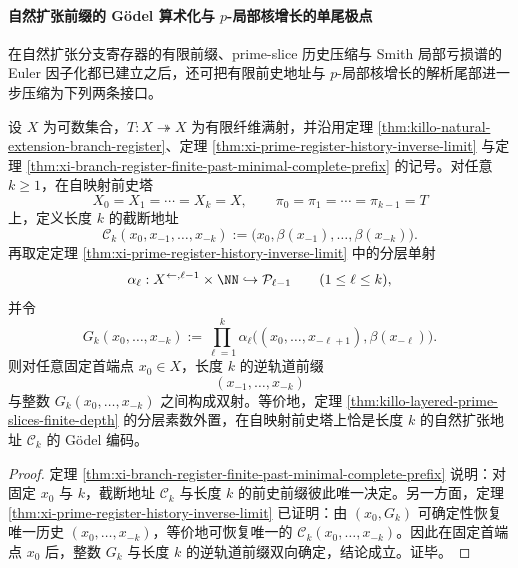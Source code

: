 \paragraph{自然扩张前缀的 Gödel 算术化与 \texorpdfstring{$p$}{p}-局部核增长的单尾极点}
在自然扩张分支寄存器的有限前缀、prime-slice 历史压缩与 Smith 局部亏损谱的 Euler 因子化都已建立之后，还可把有限前史地址与 \(p\)-局部核增长的解析尾部进一步压缩为下列两条接口。

\begin{corollary}\label{cor:xi-time-part62ba-primeslice-natural-extension-prefix-godelization}
设 \(X\) 为可数集合，\(T:X\twoheadrightarrow X\) 为有限纤维满射，并沿用定理 \ref{thm:killo-natural-extension-branch-register}、定理 \ref{thm:xi-prime-register-history-inverse-limit} 与定理 \ref{thm:xi-branch-register-finite-past-minimal-complete-prefix} 的记号。对任意 \(k\ge 1\)，在自映射前史塔
\[
X_0=X_1=\cdots=X_k=X,
\qquad
\pi_0=\pi_1=\cdots=\pi_{k-1}=T
\]
上，定义长度 \(k\) 的截断地址
\[
\mathcal C_k(x_0,x_{-1},\dots,x_{-k})
:=
\bigl(x_0,\beta(x_{-1}),\dots,\beta(x_{-k})\bigr).
\]
再取定定理 \ref{thm:xi-prime-register-history-inverse-limit} 中的分层单射
\[
\alpha_\ell:X^{\leftarrow,\ell-1}\times\NN\hookrightarrow \mathcal P_{\ell-1}
\qquad (1\le \ell\le k),
\]
并令
\[
G_k(x_0,\dots,x_{-k})
:=
\prod_{\ell=1}^{k}
\alpha_\ell\!\bigl((x_0,\dots,x_{-\ell+1}),\beta(x_{-\ell})\bigr).
\]
则对任意固定首端点 \(x_0\in X\)，长度 \(k\) 的逆轨道前缀
\[
(x_{-1},\dots,x_{-k})
\]
与整数 \(G_k(x_0,\dots,x_{-k})\) 之间构成双射。等价地，定理 \ref{thm:killo-layered-prime-slices-finite-depth} 的分层素数外置，在自映射前史塔上恰是长度 \(k\) 的自然扩张地址 \(\mathcal C_k\) 的 Gödel 编码。
\end{corollary}
\begin{proof}
定理 \ref{thm:xi-branch-register-finite-past-minimal-complete-prefix} 说明：对固定 \(x_0\) 与 \(k\)，截断地址 \(\mathcal C_k\) 与长度 \(k\) 的前史前缀彼此唯一决定。另一方面，定理 \ref{thm:xi-prime-register-history-inverse-limit} 已证明：由 \((x_0,G_k)\) 可确定性恢复唯一历史 \((x_0,\dots,x_{-k})\)，等价地可恢复唯一的 \(\mathcal C_k(x_0,\dots,x_{-k})\)。因此在固定首端点 \(x_0\) 后，整数 \(G_k\) 与长度 \(k\) 的逆轨道前缀双向确定，结论成立。证毕。
\end{proof}

